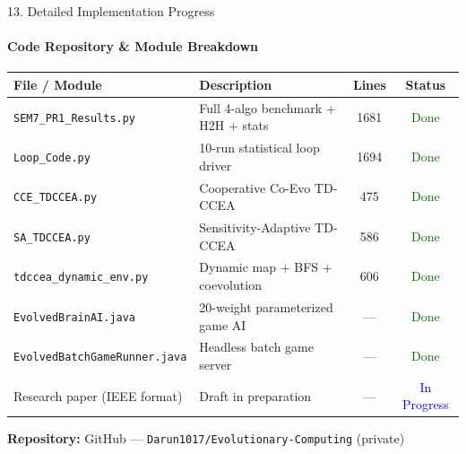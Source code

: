\documentclass[aspectratio=169, 11pt]{beamer}
\begin{document}
\begin{frame}{13. Detailed Implementation Progress}
    \framesubtitle{Code Repository \& Module Breakdown}

    \begin{table}
        \centering
        \footnotesize
        \renewcommand{\arraystretch}{1.1}
        \begin{tabular}{p{4.0cm} p{4.5cm} c c}
            \toprule
            \textbf{File / Module} & \textbf{Description} & \textbf{Lines} & \textbf{Status} \\
            \midrule
            \texttt{SEM7\_PR1\_Results.py} & Full 4-algo benchmark + H2H + stats & 1681 & \textcolor{darkGreen}{Done} \\
            \texttt{Loop\_Code.py} & 10-run statistical loop driver & 1694 & \textcolor{darkGreen}{Done} \\
            \texttt{CCE\_TDCCEA.py} & Cooperative Co-Evo TD-CCEA & 475 & \textcolor{darkGreen}{Done} \\
            \texttt{SA\_TDCCEA.py} & Sensitivity-Adaptive TD-CCEA & 586 & \textcolor{darkGreen}{Done} \\
            \texttt{tdccea\_dynamic\_env.py} & Dynamic map + BFS + coevolution & 606 & \textcolor{darkGreen}{Done} \\
            \texttt{EvolvedBrainAI.java} & 20-weight parameterized game AI & --- & \textcolor{darkGreen}{Done} \\
            \texttt{EvolvedBatchGameRunner.java} & Headless batch game server & --- & \textcolor{darkGreen}{Done} \\
            Research paper (IEEE format) & Draft in preparation & --- & \textcolor{blue}{In Progress} \\
            \bottomrule
        \end{tabular}
    \end{table}

    \vspace{0.15cm}
    {\footnotesize \textbf{Repository:} GitHub --- \texttt{Darun1017/Evolutionary-Computing} (private)}
\end{frame}

\end{document}
